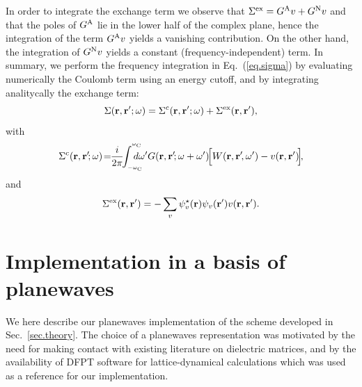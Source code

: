 \documentclass[twocolumn,prb,showpacs,superscriptaddress]{revtex4}
\def\w{\omega}
\def\wp{\omega^\prime}
\def\wc{{\omega_{\rm C}}}
\def\r{{\bf r}}
\def\rp{{\bf r^\prime}}
\begin{document}
In order to integrate the exchange term we observe that 
$\Sigma^{\rm ex}=G^{\rm A}v + G^{\rm N}v$
and that the poles of $G^{\rm A}$ lie in the lower half of the complex plane,
hence the integration of the term $G^{\rm A}v$ yields a vanishing contribution.
On the other hand, the integration of $G^{\rm N}v$ yields a constant (frequency-independent) term.\cite{note.integral}
In summary, we perform the frequency integration in Eq.\ (\ref{eq.sigma}) 
by evaluating numerically
the Coulomb term using an energy cutoff, and by integrating analitycally the exchange term:
  \begin{equation}
  \Sigma(\r,\rp;\w) = \Sigma^{\rm c}(\r,\rp;\w) + \Sigma^{\rm ex}(\r,\rp),
  \end{equation}
with
  \begin{equation}\label{eq.convolution}
 \Sigma^{\rm c}(\r,\rp\!;\w) \! = \!\! \frac{i}{2\pi} \!\!\int_{_{-\wc}}^{^\wc} \!\!\!\!\!\!\!d\wp 
 G(\r,\rp\!;\w+\wp) \!\Big[W(\r,\rp\!,\wp)-v(\r,\rp)\!\Big]\!,
  \end{equation}
and
  \begin{equation}
  \Sigma^{\rm ex}(\r,\rp) = - \sum_v \psi_v^\star(\r)\psi_v(\rp) v(\r,\rp).
  \end{equation}


\section{Implementation in a basis of planewaves}\label{sec.theory.g}

We here describe our planewaves implementation of the scheme 
developed in Sec.\ \ref{sec.theory}. The choice of a planewaves representation
was motivated by the need for making contact with existing literature on dielectric
matrices,\cite{cpm,hl86-prb,balde_tosa,baroni-resta} 
and by the availability of DFPT software for lattice-dynamical
calculations\cite{espresso} which was used as a reference for our implementation.
\end{document}
